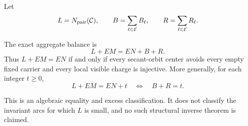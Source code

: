 Let
\[
 L=N_{\mathrm{pair}}(\mathcal{C}),\qquad
 B=\sum_{\ell\in\mathcal{E}}B_\ell,
 \qquad
 R=\sum_{\ell\in\mathcal{E}}R_\ell.
\]

\begin{corollary}
\label{cor:aggregate}
The exact aggregate balance is
\begin{equation}\label{eq:aggregate}
  L+EM=EN+B+R.
\end{equation}
Thus $L+EM=EN$ if and only if every secant-orbit center avoids every empty
fixed carrier and every local visible charge is injective.  More generally,
for each integer $t\ge0$,
\[
  L+EM=EN+t\quad\Longleftrightarrow\quad B+R=t.
\]
\end{corollary}

This is an algebraic equality and excess classification.  It does not
classify the invariant arcs for which $L$ is small, and no such structural
inverse theorem is claimed.
